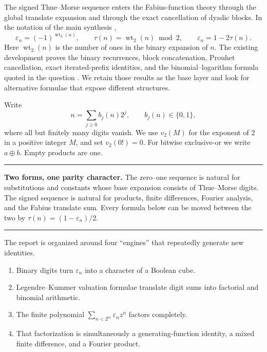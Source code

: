 \documentclass[11pt,oneside]{article}
\theoremstyle{definition}
\theoremstyle{remark}
\newcommand{\wt}{\operatorname{wt}_2}
\newcommand{\vtwo}{v_2}
\newcommand{\xor}{\mathbin{\oplus}}
\newenvironment{boxedremark}{%
  \par\smallskip\noindent\begin{center}\begin{minipage}{0.94\textwidth}%
  \color{black}\hrule\vspace{0.6em}\small
}{%
  \vspace{0.6em}\hrule\end{minipage}\end{center}\smallskip
}
\begin{document}
The signed Thue--Morse sequence enters the Fabius-function theory through the
global translate expansion and through the exact cancellation of dyadic
blocks.  In the notation of the main synthesis \cite{proveitSynthesis},
\begin{equation}
 \varepsilon_n=(-1)^{\wt(n)},
 \qquad
 \tau(n)=\wt(n)\bmod 2,
 \qquad
 \varepsilon_n=1-2\tau(n).
 \label{eq:basic-def}
\end{equation}
Here \(\wt(n)\) is the number of ones in the binary expansion of \(n\).  The
existing development proves the binary recurrences, block concatenation,
Prouhet cancellation, exact iterated-prefix identities, and the
binomial--logarithm formula quoted in the question
\cite{proveit,proveitSynthesis}.  We retain those results as the base layer and
look for alternative formulae that expose different structures.

Write
\begin{equation}
 n=\sum_{j\ge0}b_j(n)2^j,
 \qquad b_j(n)\in\{0,1\},
 \label{eq:binary-digits}
\end{equation}
where all but finitely many digits vanish.  We use \(\vtwo(M)\) for the
exponent of \(2\) in a positive integer \(M\), and set \(\vtwo(0!)=0\).
For bitwise exclusive-or we write \(a\xor b\).  Empty products are one.

\begin{boxedremark}
\textbf{Two forms, one parity character.}
The zero--one sequence is natural for substitutions and constants whose
base expansion consists of Thue--Morse digits.  The signed sequence is natural
for products, finite differences, Fourier analysis, and the Fabius translate
sum.  Every formula below can be moved between the two by
\(\tau(n)=(1-\varepsilon_n)/2\).
\end{boxedremark}

The report is organized around four ``engines'' that repeatedly generate new
identities.
\begin{enumerate}
\item Binary digits turn \(\varepsilon_n\) into a character of a Boolean cube.
\item Legendre--Kummer valuation formulae translate digit sums into factorial
      and binomial arithmetic.
\item The finite polynomial
      \(\sum_{n<2^m}\varepsilon_nz^n\) factors completely.
\item That factorization is simultaneously a generating-function identity, a
      mixed finite difference, and a Fourier product.
\end{enumerate}
\end{document}
